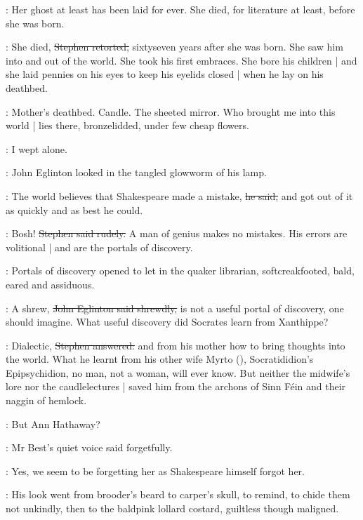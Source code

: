 \eglinton:
Her ghost at least has been laid for ever.
She died,
for literature at least,
before she was born.

\Stephen:
She died,
\sout{Stephen retorted,}
sixtyseven years after she was born.
She saw him into and out of the world.
She took his first embraces.
She bore his children |
and she laid pennies on his eyes to keep his eyelids closed |
when he lay
on his deathbed.

\StephenInt:
Mother's deathbed.
Candle.
The sheeted mirror.
Who brought me into this world |
lies there,
bronzelidded,
under few cheap flowers.

\StephenInt:
I wept alone.

:
John Eglinton looked in the tangled glowworm of his lamp.

\eglinton:
The world believes that Shakespeare made a mistake,
\sout{he said,}
and got out of it as quickly and as best he could.

\Stephen:
Bosh!
\sout{Stephen said rudely.}
A man of genius makes no mistakes.
His errors are volitional |
and are the portals of discovery.

:
Portals of discovery opened
to let in the quaker librarian,
softcreakfooted, bald, eared and assiduous.

\eglinton:
A shrew,
\sout{John Eglinton said shrewdly,}
is not a useful portal of discovery,
one should imagine.
What useful discovery did Socrates learn from Xanthippe?

\Stephen:
Dialectic,
\sout{Stephen answered:}
and from his mother how to bring thoughts into the world.
What he learnt from his other wife Myrto (),
Socratididion's Epipsychidion,
no man, not a woman, will ever know.
But neither the midwife's lore nor the caudlelectures |
saved him from the archons of Sinn Féin and their naggin of hemlock.

\best:
But Ann Hathaway?

:
Mr Best's quiet voice said forgetfully.

\best:
Yes,
we seem to be forgetting her as Shakespeare himself forgot her.

:
His look went from brooder's beard to carper's skull,
to remind,
to chide them not unkindly,
then to the baldpink lollard costard,
guiltless though maligned.

